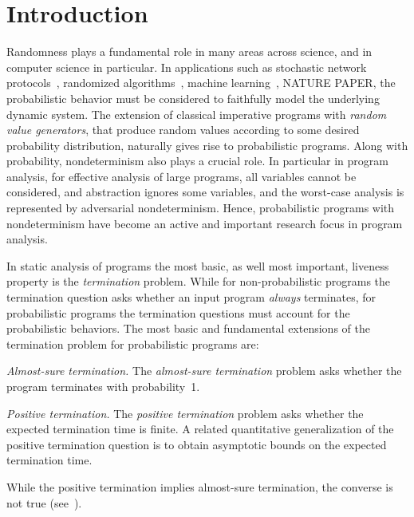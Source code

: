 

\section{Introduction}\label{sec:introduction}


Randomness plays a fundamental role in many areas across science, and in 
computer science in particular.
In applications such as stochastic network protocols~\cite{BaierBook,prism},
randomized algorithms~\cite{RandBook,RandBook2}, machine learning~\cite{},
NATURE PAPER, the probabilistic behavior must be considered to faithfully model
the underlying dynamic system.
The extension of classical imperative programs with \emph{random value generators}, 
that produce random values according to some desired probability distribution, 
naturally gives rise to probabilistic programs.
Along with probability, nondeterminism also plays a crucial role.
In particular in program analysis, for effective analysis of large programs,
all variables cannot be considered, and abstraction ignores some variables,
and the worst-case analysis is represented by adversarial nondeterminism.
Hence, probabilistic programs with nondeterminism have become an active and 
important research focus in program analysis. 
 


\smallskip{} 
In static analysis of programs the most basic, as well most important, 
liveness property is the {\em termination} problem.
While for non-probabilistic programs the termination question asks whether
an input program {\em always} terminates, for probabilistic programs 
the termination questions must account for the probabilistic behaviors. 
The most basic and fundamental extensions of the termination problem 
for probabilistic programs are:

\begin{compactenum}
\item \emph{Almost-sure termination.} 
The \emph{almost-sure termination} problem asks whether the program terminates with probability~1.


\item \emph{Positive termination.} 
The \emph{positive termination} problem asks whether the expected termination time is finite.
A related quantitative generalization of the positive termination question is to obtain 
asymptotic bounds on the expected termination time.

\end{compactenum}
While the positive termination implies almost-sure termination, the converse is not true (see~\cite[]{}).




